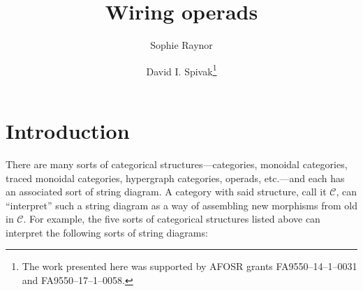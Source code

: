 \documentclass[11pt, article, oneside]{memoir}
\theoremstyle{plain}
\theoremstyle{definition}
\theoremstyle{remark}
\newcommand{\cat}[1]{\mathcal{#1}}
\begin{document}
\title{Wiring operads}

\author{
  Sophie Raynor
  \and 
  David I. Spivak\thanks{The work presented here was supported by AFOSR grants 
FA9550--14--1--0031 and FA9550--17--1--0058.}
}
\date{}

\maketitle

\chapter{Introduction}

There are many sorts of categorical structures---categories, monoidal categories, traced monoidal categories, hypergraph categories, operads, etc.---and each has an associated sort of string diagram. A category with said structure, call it $\cat{C}$, can ``interpret'' such a string diagram as a way of assembling new morphisms from old in $\cat{C}$. For example, the five sorts of categorical structures listed above can interpret the following sorts of string diagrams:
\end{document}
